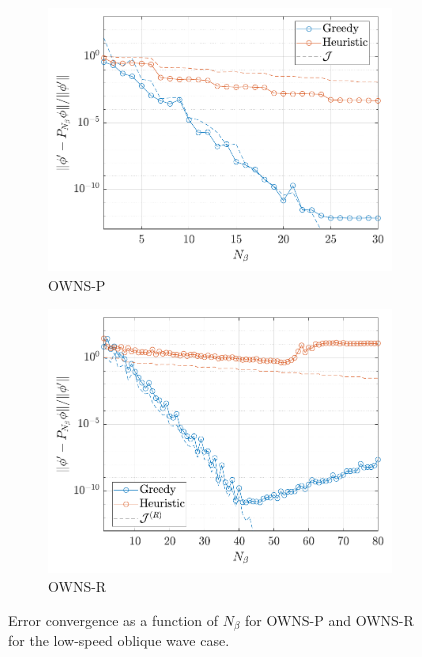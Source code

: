 \begin{figure}
    \centering
    \begin{subfigure}[b]{0.48\textwidth}
        \centering
        \includegraphics[width=1\linewidth]{figures/Oblique_Err_Obj_P.pdf}
        \caption{OWNS-P}\label{fig:oblique-err-p}
    \end{subfigure}
    \begin{subfigure}[b]{0.48\textwidth}
        \centering
        \includegraphics[width=1\linewidth]{figures/Oblique_Err_Obj_R.pdf}
        \caption{OWNS-R}\label{fig:oblique-err-r}
    \end{subfigure}
    \caption{Error convergence as a function of $N_\beta$ for OWNS-P and OWNS-R for the low-speed oblique wave case.}
    \label{fig:oblique-err}
\end{figure}



